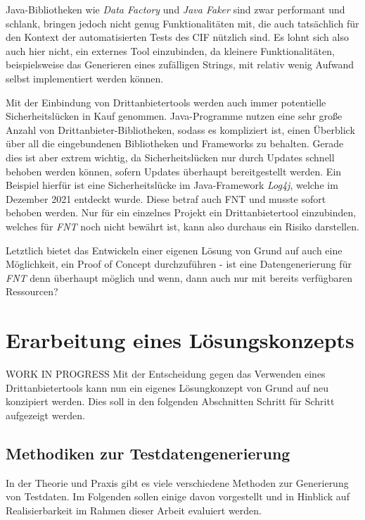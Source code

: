 Java-Bibliotheken wie \textit{Data Factory} und \textit{Java Faker} sind zwar performant und schlank, bringen jedoch nicht genug Funktionalitäten mit, die auch tatsächlich für den Kontext der automatisierten Tests des \ac{CIF} nützlich sind. Es lohnt sich also auch hier nicht, ein externes Tool einzubinden, da kleinere Funktionalitäten, beispielsweise das Generieren eines zufälligen Strings, mit relativ wenig Aufwand selbst implementiert werden können.

Mit der Einbindung von Drittanbietertools werden auch immer potentielle Sicherheitslücken in Kauf genommen. Java-Programme nutzen eine sehr große Anzahl von Drittanbieter-Bibliotheken, sodass es kompliziert ist, einen Überblick über all die eingebundenen Bibliotheken und Frameworks zu behalten. Gerade dies ist aber extrem wichtig, da Sicherheitslücken nur durch Updates schnell behoben werden können, sofern Updates überhaupt bereitgestellt werden. \cite{veracode:2021} Ein Beispiel hierfür ist eine Sicherheitslücke im Java-Framework \textit{Log4j}, welche im Dezember 2021 entdeckt wurde. Diese betraf auch FNT und musste sofort behoben werden. \cite{mit:2021} Nur für ein einzelnes Projekt ein Drittanbietertool einzubinden, welches für \textit{FNT} noch nicht bewährt ist, kann also durchaus ein Risiko darstellen.

Letztlich bietet das Entwickeln einer eigenen Lösung von Grund auf auch eine Möglichkeit, ein Proof of Concept durchzuführen - ist eine Datengenerierung für \textit{FNT} denn überhaupt möglich und wenn, dann auch nur mit bereits verfügbaren Ressourcen?

\section{Erarbeitung eines Lösungskonzepts}\label{sec:loesungskonzept}
WORK IN PROGRESS
Mit der Entscheidung gegen das Verwenden eines Drittanbietertools kann nun ein eigenes Lösungkonzept von Grund auf neu konzipiert werden. Dies soll in den folgenden Abschnitten Schritt für Schritt aufgezeigt werden.

\subsection{Methodiken zur Testdatengenerierung}\label{subsec:methodiken}
In der Theorie und Praxis gibt es viele verschiedene Methoden zur Generierung von Testdaten. Im Folgenden sollen einige davon vorgestellt und in Hinblick auf Realisierbarkeit im Rahmen dieser Arbeit evaluiert werden.

